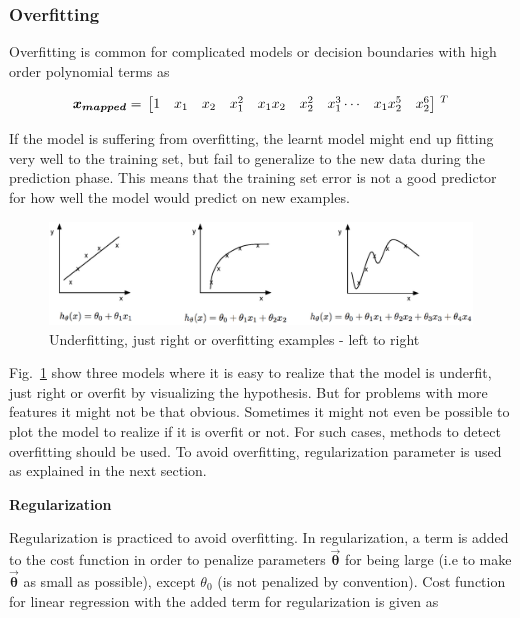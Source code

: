 \subsubsection{Overfitting}

Overfitting is common for complicated models or decision boundaries with high order polynomial terms as

\begin{equation}{\label{eqn:featureMapping2}}
\bm{x_{mapped}}
=\,
\begin{bmatrix}
1 & x_1 & x_2 & x_1^2 & x_1x_2 & x_2^2 & x_1^3 \cdots & x_1x_2^5 & x_2^6 
\end{bmatrix}
\,^ T
\end{equation} 

If the model is suffering from overfitting, the learnt model might end up fitting very well to the training set, but fail to generalize to the new data during the prediction phase. 
This means that the training set error is not a good predictor for how well the model would predict on new examples.

\begin{figure}
\begin{center}
\includegraphics[width=16cm]{figures/underOverFit}    %
\caption{Underfitting, just right or overfitting examples - left to right} 
\label{fig:underOverFit}
\end{center}
\end{figure}

Fig.~\ref{fig:underOverFit} show three models where it is easy to realize that the model is underfit, just right or overfit by visualizing the hypothesis. 
But for problems with more features it might not be that obvious. Sometimes it might not even be possible to plot the model to realize if it is overfit or not.
For such cases, methods to detect overfitting should be used. 
To avoid overfitting, regularization parameter is used as explained in the next section.

\textbf{Regularization}

Regularization is practiced to avoid overfitting.
In regularization, a term is added to the cost function in order to penalize parameters $\vec{\bm{\theta}}$ for being large (i.e to make $\vec{\bm{\theta}}$ as small as possible), except ${\theta}_0$ (is not penalized by convention). Cost function for linear regression with the added term for regularization is given as

